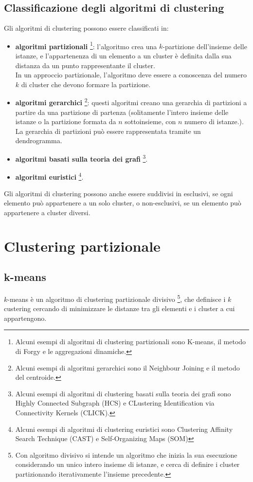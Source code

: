 \subsection{Classificazione degli algoritmi di clustering}
Gli algoritmi di clustering possono essere classificati in:
\begin{itemize}
    \item \textbf{algoritmi partizionali} \footnote{Alcuni esempi di algoritmi di clustering partizionali sono K-means, il metodo di Forgy e le aggregazioni dinamiche.}: l'algoritmo crea una $k$-partizione dell'insieme delle istanze, e l'appartenenza di un elemento a un cluster è definita dalla sua distanza da un punto rappresentante il cluster.\\
    In un approccio partizionale, l'algoritmo deve essere a conoscenza del numero $k$ di cluster che devono formare la partizione.\\
    \item \textbf{algoritmi gerarchici} \footnote{Alcuni esempi di algoritmi gerarchici sono il Neighbour Joining e il metodo del centroide.}: questi algoritmi creano una gerarchia di partizioni a partire da una partizione di partenza (solitamente l'intero insieme delle istanze o la partizione formata da $n$ sottoinsieme, con $n$ numero di istanze.).\\
    La gerarchia di partizioni può essere rappresentata tramite un dendrogramma.
    \item \textbf{algoritmi basati sulla teoria dei grafi} \footnote{Alcuni esempi di algoritmi di clustering basati sulla teoria dei grafi sono Highly Connected Subgraph (HCS) e CLustering Identification via Connectivity Kernels (CLICK).}.
    \item \textbf{algoritmi euristici} \footnote{Alcuni esempi di algoritmi di clustering euristici sono Clustering Affinity Search Technique (CAST) e Self-Organizing Maps (SOM)}.
\end{itemize}
Gli algoritmi di clustering possono anche essere suddivisi in esclusivi, se ogni elemento può appartenere a un solo cluster, o non-esclusivi, se un elemento può appartenere a cluster diversi.

\section{Clustering partizionale}
\subsection{k-means}
$k$-means è un algoritmo di clustering partizionale divisivo \footnote{Con algoritmo divisivo si intende un algoritmo che inizia la sua esecuzione considerando un unico intero insieme di istanze, e cerca di definire i cluster partizionando iterativamente l'insieme precedente.}, che definisce i $k$ custering cercando di minimizzare le distanze tra gli elementi e i cluster a cui appartengono.

